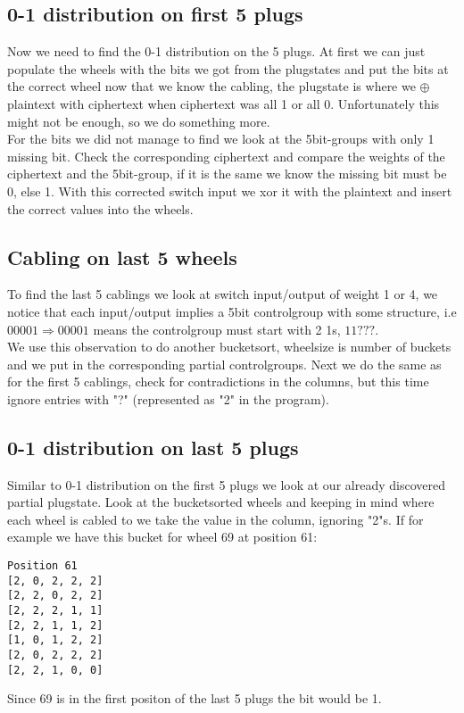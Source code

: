 \documentclass{article}
\begin{document}
\subsection*{0-1 distribution on first 5 plugs}

Now we need to find the 0-1 distribution on the 5 plugs. At first we can just populate the wheels with the bits we got from the plugstates and put the bits at the correct wheel now that we know the cabling, the plugstate is where we $\oplus$ plaintext with ciphertext when ciphertext was all 1 or all 0. Unfortunately this might not be enough, so we do something more.\\
For the bits we did not manage to find we look at the 5bit-groups with only 1 missing bit. Check the corresponding ciphertext and compare the weights of the ciphertext and the 5bit-group, if it is the same we know the missing bit must be 0, else 1. With this corrected switch input we xor it with the plaintext and insert the correct values into the wheels.

\subsection*{Cabling on last 5 wheels}

To find the last 5 cablings we look at switch input/output of weight 1 or 4, we notice that each input/output implies a 5bit controlgroup with some structure, i.e $00001 \Rightarrow 00001$ means the controlgroup must start with 2 1s, $11???$.\\
We use this observation to do another bucketsort, wheelsize is number of buckets and we put in the corresponding partial controlgroups. Next we do the same as for the first 5 cablings, check for contradictions in the columns, but this time ignore entries with "?" (represented as "2" in the program).

\subsection*{0-1 distribution on last 5 plugs}

Similar to 0-1 distribution on the first 5 plugs we look at our already discovered partial plugstate. Look at the bucketsorted wheels and keeping in mind where each wheel is cabled to we take the value in the column, ignoring "2"s. If for example we have this bucket for wheel 69 at position 61:
\begin{verbatim}
Position 61	
[2, 0, 2, 2, 2]
[2, 2, 0, 2, 2]
[2, 2, 2, 1, 1]
[2, 2, 1, 1, 2]
[1, 0, 1, 2, 2]
[2, 0, 2, 2, 2]
[2, 2, 1, 0, 0]
\end{verbatim}
Since 69 is in the first positon of the last 5 plugs the bit would be 1.
\end{document}
